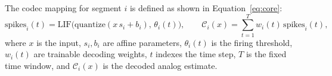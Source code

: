 \documentclass{article}
\theoremstyle{plain}
\theoremstyle{definition}
\theoremstyle{remark}
\begin{document}



The codec mapping for segment $i$ is defined as shown in Equation~\ref{eq:core}:
\begin{equation}
\label{eq:core}
\text{spikes}_i(t) = \mathrm{LIF}\!\big(\mathrm{quantize}(x\, s_i + b_i),\, \theta_i(t)\big), 
\qquad
\mathcal{C}_i(x) = \sum_{t=1}^{T} w_i(t)\, \text{spikes}_i(t),
\end{equation}
where $x$ is the input, $s_i,b_i$ are affine parameters, $\theta_i(t)$ is the firing threshold, $w_i(t)$ are trainable decoding weights, $t$ indexes the time step, $T$ is the fixed time window, and $\mathcal{C}_i(x)$ is the decoded analog estimate.  
\end{document}
